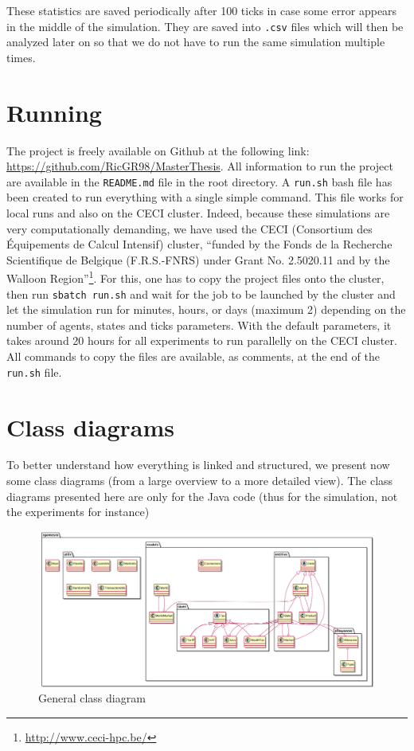 These statistics are saved periodically after 100 ticks in case some error appears in the middle of the simulation. They are saved into \texttt{.csv} files which will then be analyzed later on so that we do not have to run the same simulation multiple times. 


\section{Running}
The project is freely available on Github at the following link: \url{https://github.com/RicGR98/MasterThesis}. All information to run the project are available in the \texttt{README.md} file in the root directory. A \texttt{run.sh} bash file has been created to run everything with a single simple command. This file works for local runs and also on the CECI cluster. Indeed, because these simulations are very computationally demanding, we have used the CECI (Consortium des Équipements de Calcul Intensif) cluster, ``funded by the Fonds de la Recherche Scientifique de Belgique (F.R.S.-FNRS) under Grant No. 2.5020.11 and by the Walloon Region''\footnote{\url{http://www.ceci-hpc.be/}}. For this, one has to copy the project files onto the cluster, then run \texttt{sbatch run.sh} and wait for the job to be launched by the cluster and let the simulation run for minutes, hours, or days (maximum 2) depending on the number of agents, states and ticks parameters. With the default parameters, it takes around 20 hours for all experiments to run parallelly on the CECI cluster. All commands to copy the files are available, as comments, at the end of the \texttt{run.sh} file.


\section{Class diagrams}

    To better understand how everything is linked and structured, we present now some class diagrams (from a large overview to a more detailed view). The class diagrams presented here are only for the Java code (thus for the simulation, not the experiments for instance)


    \begin{figure}[H]
        \centering
        \includegraphics[width=1\textwidth]{img/generalCD.png}
        \caption{General class diagram}
        \label{fig:class_diagram_general}
    \end{figure}


